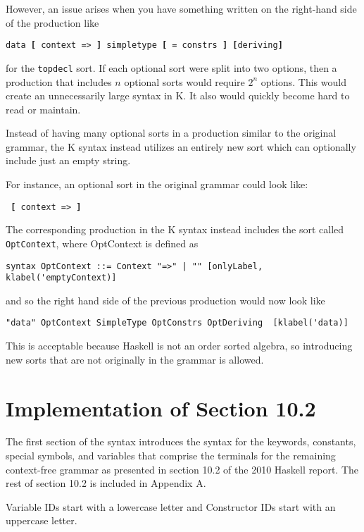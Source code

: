 However, an issue arises when you have something written on the right-hand side of the production like

\texttt{data \textbf{[} context => \textbf{]} simpletype \textbf{[} = constrs \textbf{]} \textbf{[}deriving\textbf{]}}

\noindent
for the \texttt{topdecl} sort. If each optional sort were split into two options, then a production that includes $n$ optional sorts would require $2^n$ options. This would create an unnecessarily large syntax in K. It also would quickly become hard to read or maintain.

Instead of having many optional sorts in a production similar to the original grammar, the K syntax instead utilizes an entirely new sort which can optionally include just an empty string.

For instance, an optional sort in the original grammar could look like:

\texttt{ \textbf{[} context => \textbf{]} }

The corresponding production in the K syntax instead includes the sort called \texttt{OptContext}, where OptContext is defined as

\begin{lstlisting}
syntax OptContext ::= Context "=>" | "" [onlyLabel, klabel('emptyContext)]
\end{lstlisting}

\noindent
and so the right hand side of the previous production would now look like

\begin{lstlisting}
"data" OptContext SimpleType OptConstrs OptDeriving  [klabel('data)]
\end{lstlisting}

This is acceptable because Haskell is not an order sorted algebra, so introducing new sorts that are not originally in the grammar is allowed.

\section{Implementation of Section 10.2}
The first section of the syntax introduces the syntax for the keywords, constants, special symbols, and variables that comprise the terminals for the remaining context-free grammar as presented in section 10.2 of the 2010 Haskell report. The rest of section 10.2 is included in Appendix A.

Variable IDs start with a lowercase letter and Constructor IDs start with an uppercase letter.

